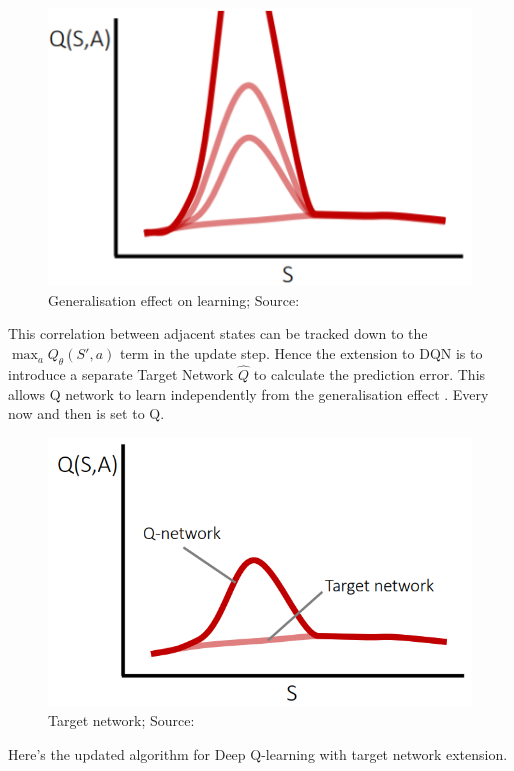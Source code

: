 \begin{figure}[h!h!h!h]
\includegraphics[scale=0.5]{figures/target 4.PNG}
  \caption{Generalisation effect on learning; Source: \cite{lecture_dqn}}
  \label{fig:generalisation_curse}
\end{figure}

This correlation between adjacent states can be tracked down to the $\max_a Q_{\theta}(S', a)$ term in the update step. Hence the 
extension to DQN is to introduce a separate Target Network $\hat{Q}$ to calculate the prediction error. This allows Q network to learn independently from the generalisation effect \cite{lecture_dqn}. Every now and then  is set to Q.

\begin{figure}[H]
\centering
\includegraphics[scale=0.4]{figures/target 0.PNG}
  \caption{Target network; Source: \cite{lecture_dqn}}
  \label{fig:target_network}
\end{figure}

Here's the updated algorithm for Deep Q-learning with target network extension.


